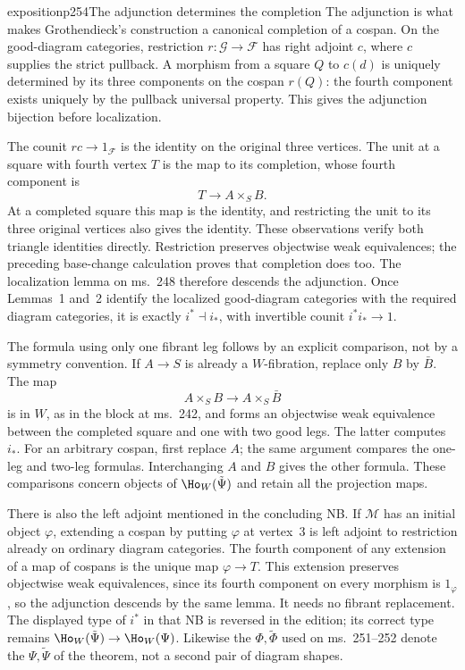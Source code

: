 \begin{dcomment}{exposition}{p254}{The adjunction determines the completion}
The adjunction is what makes Grothendieck's construction a canonical completion of a cospan. On the good-diagram categories, restriction $r:\mathcal G\to\mathcal F$ has right adjoint $c$, where $c$ supplies the strict pullback. A morphism from a square $Q$ to $c(d)$ is uniquely determined by its three components on the cospan $r(Q)$: the fourth component exists uniquely by the pullback universal property. This gives the adjunction bijection before localization.

The counit $rc\to1_{\mathcal F}$ is the identity on the original three vertices. The unit at a square with fourth vertex $T$ is the map to its completion, whose fourth component is
\[
 T\longrightarrow A\times_S B.
\]
At a completed square this map is the identity, and restricting the unit to its three original vertices also gives the identity. These observations verify both triangle identities directly. Restriction preserves objectwise weak equivalences; the preceding base-change calculation proves that completion does too. The localization lemma on ms.~248 therefore descends the adjunction. Once Lemmas~1 and~2 identify the localized good-diagram categories with the required diagram categories, it is exactly $i^*\dashv i_*$, with invertible counit $i^*i_*\to1$.

The formula using only one fibrant leg follows by an explicit comparison, not by a symmetry convention. If $A\to S$ is already a $W$-fibration, replace only $B$ by $\bar B$. The map
\[
 A\times_S B\longrightarrow A\times_S\bar B
\]
is in $W$, as in the block at ms.~242, and forms an objectwise weak equivalence between the completed square and one with two good legs. The latter computes $i_*$. For an arbitrary cospan, first replace $A$; the same argument compares the one-leg and two-leg formulas. Interchanging $A$ and $B$ gives the other formula. These comparisons concern objects of $\Ho_W(\tilde\Psi)$ and retain all the projection maps.

There is also the left adjoint mentioned in the concluding NB. If $\mathcal M$ has an initial object $\varphi$, extending a cospan by putting $\varphi$ at vertex~$3$ is left adjoint to restriction already on ordinary diagram categories. The fourth component of any extension of a map of cospans is the unique map $\varphi\to T$. This extension preserves objectwise weak equivalences, since its fourth component on every morphism is $1_\varphi$, so the adjunction descends by the same lemma. It needs no fibrant replacement. The displayed type of $i^*$ in that NB is reversed in the edition; its correct type remains $\Ho_W(\tilde\Psi)\to\Ho_W(\Psi)$. Likewise the $\Phi,\tilde\Phi$ used on ms.~251--252 denote the $\Psi,\tilde\Psi$ of the theorem, not a second pair of diagram shapes.
\end{dcomment}


